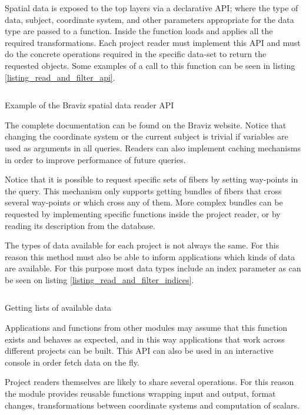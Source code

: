 Spatial data is exposed to the top layers via a declarative API; where the type of data, subject, coordinate system, and other parameters appropriate for the data type are passed to a function. Inside the function loads and applies all the required transformations. Each project reader must implement this API and must do the concrete operations required in the specific data-set to return the requested objects. Some examples of a call to this function can be seen in listing \ref{listing_read_and_filter_api}.

\begin{listing}
\inputminted{python}{code/read_and_filter_1.py}
\caption{Example of the Braviz spatial data reader API}
\label{listing_read_and_filter_api}
\end{listing}

The complete documentation can be found on the Braviz website. Notice that changing the coordinate system or the current subject is trivial if variables are used as arguments in all queries. Readers can also implement caching mechanisms in order to improve performance of future queries.  

Notice that it is possible to request specific sets of fibers by setting way-points in the query. This mechanism only supports getting bundles of fibers that cross several way-points or which cross any of them. More complex bundles can be requested by implementing specific functions inside the project reader, or by reading its description from the database. 

The types of data available for each project is not always the same. For this reason this method must also be able to inform applications which kinds of data are available. For this purpose most data types include an index parameter as can be seen on listing \ref{listing_read_and_filter_indices}.

\begin{listing}
\inputminted{python}{code/read_and_filter_indices.py}
\caption{Getting lists of available data}
\label{listing_read_and_filter_indices}
\end{listing}

Applications and functions from other modules may assume that this function exists and behaves as expected, and in this way applications that work across different projects can be built. This API can also be used in an interactive console in order fetch data on the fly.

Project readers themselves are likely to share several operations. For this reason the module provides reusable functions wrapping input and output, format changes, transformations between coordinate systems and computation of scalars.

